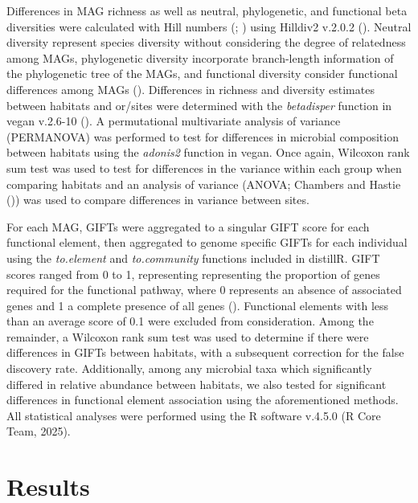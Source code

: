 \documentclass[
  12pt,
]{article}
\begin{document}
Differences in MAG richness as well as neutral, phylogenetic, and
functional beta diversities were calculated with Hill numbers
(;
) using Hilldiv2
v.2.0.2 (). Neutral
diversity represent species diversity without considering the degree of
relatedness among MAGs, phylogenetic diversity incorporate branch-length
information of the phylogenetic tree of the MAGs, and functional
diversity consider functional differences among MAGs
().
Differences in richness and diversity estimates between habitats and
or/sites were determined with the \emph{betadisper} function in vegan
v.2.6-10 (). A
permutational multivariate analysis of variance (PERMANOVA) was
performed to test for differences in microbial composition between
habitats using the \emph{adonis2} function in vegan. Once again,
Wilcoxon rank sum test was used to test for differences in the variance
within each group when comparing habitats and an analysis of variance
(ANOVA; Chambers and Hastie
()) was used to compare
differences in variance between sites.

For each MAG, GIFTs were aggregated to a singular GIFT score for each
functional element, then aggregated to genome specific GIFTs for each
individual using the \emph{to.element} and \emph{to.community} functions
included in distillR. GIFT scores ranged from 0 to 1, representing
representing the proportion of genes required for the functional
pathway, where 0 represents an absence of associated genes and 1 a
complete presence of all genes
(). Functional
elements with less than an average score of 0.1 were excluded from
consideration. Among the remainder, a Wilcoxon rank sum test was used to
determine if there were differences in GIFTs between habitats, with a
subsequent correction for the false discovery rate. Additionally, among
any microbial taxa which significantly differed in relative abundance
between habitats, we also tested for significant differences in
functional element association using the aforementioned methods. All
statistical analyses were performed using the R software v.4.5.0 (R Core
Team, 2025).

\section{Results}\label{results}
\end{document}
